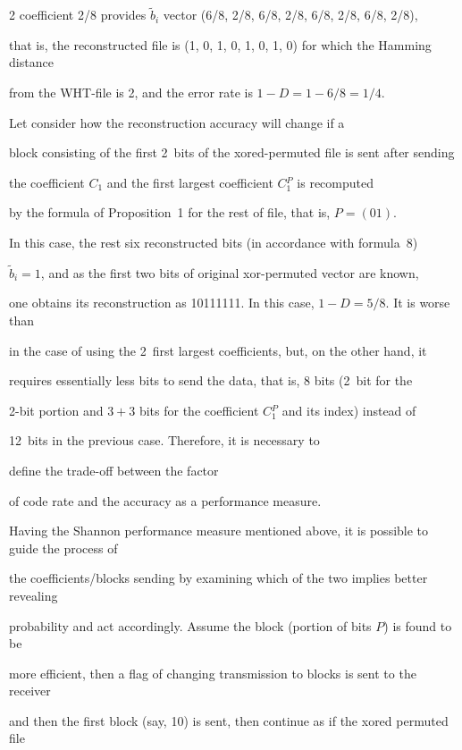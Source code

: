 \begin{multicols}{2}
coefficient 2/8 provides $ \tilde b_i$  vector (6/8, 2/8, 6/8, 2/8, 6/8, 2/8, 6/8, 2/8),  

that is, the reconstructed file is (1, 0, 1, 0, 1, 0, 1, 0) for which the Hamming distance 

from the WHT-file is 2, and the error rate is $1-D=1-6/8=1/4$.



Let consider how the reconstruction accuracy will change if a 

block consisting of the first 2~bits of the xored-permuted file is sent after sending 

the coefficient  $C_1$  and the first largest coefficient $C{^P_1}$ is recomputed

by the formula  of {Proposition~1} for the rest of file, that is, $P=(01)$. 

In this case, the rest six reconstructed bits (in accordance  with formula~8)  

$\tilde b_i =1$, and as  the first two bits of original xor-permuted vector are known, 

one obtains its reconstruction as 10111111. In this case, $1-D=5/8$. It is worse than 

in the case of using the 2~first largest coefficients, but, on the other hand, it 

requires essentially less bits to send the data, that is, 8 bits (2~bit for the 

2-bit portion and $3+3$ bits for the coefficient  $C{^P_1}$  and its index) instead of 

12~bits in the previous case. Therefore, it is necessary to 

define the trade-off between the factor 

of code rate and the accuracy as a performance measure.



Having the Shannon performance measure mentioned above, it is possible to guide the process of 

the coefficients/blocks sending by examining which of the two implies better revealing 

probability and act accordingly. Assume the block (portion of bits $P$) is found to be 

more efficient, then  a flag of changing transmission to blocks is sent to the receiver 

and then the first block (say, 10) is sent, then continue as if the xored permuted file 


\end{multicols}
